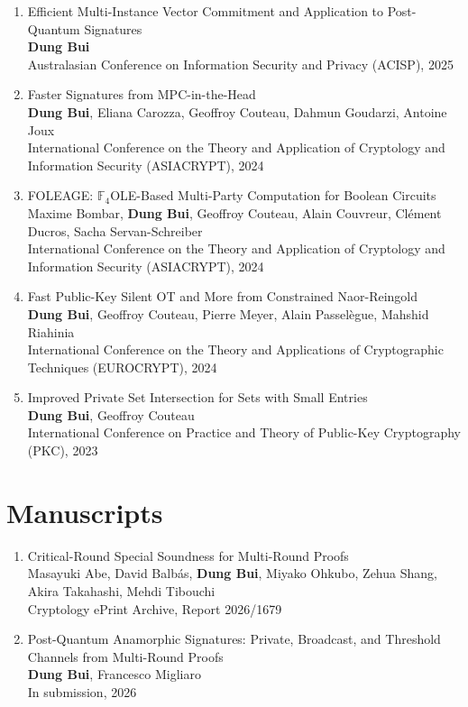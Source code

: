 \documentclass[11pt]{article}
\begin{document}
\begin{enumerate}
  \item Efficient Multi-Instance Vector Commitment and Application to Post-Quantum Signatures\\
        \textbf{Dung Bui}\\
        Australasian Conference on Information Security and Privacy (ACISP), 2025
  \item Faster Signatures from MPC-in-the-Head\\
        \textbf{Dung Bui}, Eliana Carozza, Geoffroy Couteau, Dahmun Goudarzi, Antoine Joux\\
        International Conference on the Theory and Application of Cryptology and Information Security (ASIACRYPT), 2024
  \item FOLEAGE: $\mathbb{F}_4$OLE-Based Multi-Party Computation for Boolean Circuits\\
        Maxime Bombar, \textbf{Dung Bui}, Geoffroy Couteau, Alain Couvreur, Cl\'ement Ducros, Sacha Servan-Schreiber\\
        International Conference on the Theory and Application of Cryptology and Information Security (ASIACRYPT), 2024
  \item Fast Public-Key Silent OT and More from Constrained Naor-Reingold\\
        \textbf{Dung Bui}, Geoffroy Couteau, Pierre Meyer, Alain Passel\`egue, Mahshid Riahinia\\
        International Conference on the Theory and Applications of Cryptographic Techniques (EUROCRYPT), 2024
  \item Improved Private Set Intersection for Sets with Small Entries\\
        \textbf{Dung Bui}, Geoffroy Couteau\\
        International Conference on Practice and Theory of Public-Key Cryptography (PKC), 2023
\end{enumerate}

\section{Manuscripts}
\begin{enumerate}
  \item Critical-Round Special Soundness for Multi-Round Proofs\\
        Masayuki Abe, David Balb\'as, \textbf{Dung Bui}, Miyako Ohkubo, Zehua Shang, Akira Takahashi, Mehdi Tibouchi\\
        Cryptology ePrint Archive, Report 2026/1679
  \item Post-Quantum Anamorphic Signatures: Private, Broadcast, and Threshold Channels from Multi-Round Proofs\\
        \textbf{Dung Bui}, Francesco Migliaro\\
        In submission, 2026
\end{enumerate}
\end{document}
